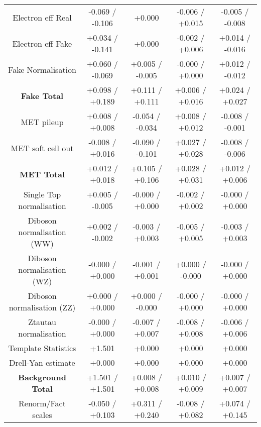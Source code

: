 \begin{table}[htbp]
\begin{center}
\begin{tabular}{|c|c|c|c|c|}
Electron eff Real                     &-0.069   / -0.106   & +0.000              & -0.006   / +0.015   & -0.005   / -0.008  \\
Electron eff Fake                     &+0.034   / -0.141   & +0.000              & -0.002   / +0.006   & +0.014   / -0.016  \\
Fake Normalisation                    &+0.060   / -0.069   & +0.005   / -0.005   & -0.000   / +0.000   & +0.012   / -0.012  \\
\hline
\textbf{Fake Total}                   &+0.098   / +0.189   & +0.111   / +0.111   & +0.006   / +0.016   & +0.024   / +0.027  \\
\hline
MET pileup                            &+0.008   / +0.008   & -0.054   / -0.034   & +0.008   / +0.012   & -0.008   / -0.001  \\
MET soft cell out                     &-0.008   / +0.016   & -0.090   / -0.101   & +0.027   / +0.028   & -0.008   / -0.006  \\
\hline
\textbf{MET Total}                    &+0.012   / +0.018   & +0.105   / +0.106   & +0.028   / +0.031   & +0.012   / +0.006  \\
\hline
Single Top normalisation              &+0.005   / -0.005   & -0.000   / +0.000   & -0.002   / +0.002   & -0.000   / +0.000  \\
Diboson normalisation (WW)            &+0.002   / -0.002   & -0.003   / +0.003   & -0.005   / +0.005   & -0.003   / +0.003  \\
Diboson normalisation (WZ)            &-0.000   / +0.000   & -0.001   / +0.001   & +0.000   / -0.000   & -0.000   / +0.000  \\
Diboson normalisation (ZZ)            &+0.000   / +0.000   & +0.000   / -0.000   & -0.000   / +0.000   & -0.000   / +0.000  \\
Ztautau normalisation                 &-0.000   / +0.000   & -0.007   / +0.007   & -0.008   / +0.008   & -0.006   / +0.006  \\
Template Statistics                   &+1.501              & +0.000              & +0.000              & +0.000             \\
Drell-Yan estimate                    &+0.000              & +0.000              & +0.000              & +0.000             \\
\hline
\textbf{Background Total}             &+1.501   / +1.501   & +0.008   / +0.008   & +0.010   / +0.009   & +0.007   / +0.007  \\
\hline
Renorm/Fact scales                    &-0.050   / +0.103   & +0.311   / +0.240   & -0.008   / +0.082   & +0.074   / +0.145  \\

\end{tabular}
\end{center}
\end{table}
